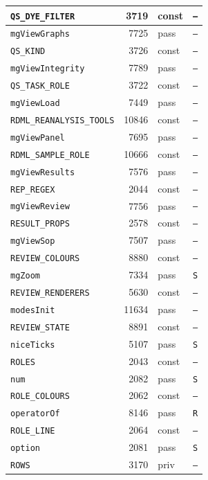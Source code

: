 {\begin{xltabular}{\linewidth}{|l|r|X|X|}
\texttt{QS\_DYE\_FILTER} & 3719 & const & \texttt{--} \\ \hline
\texttt{mgViewGraphs} & 7725 & pass & \texttt{--} \\ \hline
\texttt{QS\_KIND} & 3726 & const & \texttt{--} \\ \hline
\texttt{mgViewIntegrity} & 7789 & pass & \texttt{--} \\ \hline
\texttt{QS\_TASK\_ROLE} & 3722 & const & \texttt{--} \\ \hline
\texttt{mgViewLoad} & 7449 & pass & \texttt{--} \\ \hline
\texttt{RDML\_REANALYSIS\_TOOLS} & 10846 & const & \texttt{--} \\ \hline
\texttt{mgViewPanel} & 7695 & pass & \texttt{--} \\ \hline
\texttt{RDML\_SAMPLE\_ROLE} & 10666 & const & \texttt{--} \\ \hline
\texttt{mgViewResults} & 7576 & pass & \texttt{--} \\ \hline
\texttt{REP\_REGEX} & 2044 & const & \texttt{--} \\ \hline
\texttt{mgViewReview} & 7756 & pass & \texttt{--} \\ \hline
\texttt{RESULT\_PROPS} & 2578 & const & \texttt{--} \\ \hline
\texttt{mgViewSop} & 7507 & pass & \texttt{--} \\ \hline
\texttt{REVIEW\_COLOURS} & 8880 & const & \texttt{--} \\ \hline
\texttt{mgZoom} & 7334 & pass & \texttt{S} \\ \hline
\texttt{REVIEW\_RENDERERS} & 5630 & const & \texttt{--} \\ \hline
\texttt{modesInit} & 11634 & pass & \texttt{--} \\ \hline
\texttt{REVIEW\_STATE} & 8891 & const & \texttt{--} \\ \hline
\texttt{niceTicks} & 5107 & pass & \texttt{S} \\ \hline
\texttt{ROLES} & 2043 & const & \texttt{--} \\ \hline
\texttt{num} & 2082 & pass & \texttt{S} \\ \hline
\texttt{ROLE\_COLOURS} & 2062 & const & \texttt{--} \\ \hline
\texttt{operatorOf} & 8146 & pass & \texttt{R} \\ \hline
\texttt{ROLE\_LINE} & 2064 & const & \texttt{--} \\ \hline
\texttt{option} & 2081 & pass & \texttt{S} \\ \hline
\texttt{ROWS} & 3170 & priv & \texttt{--} \\ \hline

\end{xltabular}}
